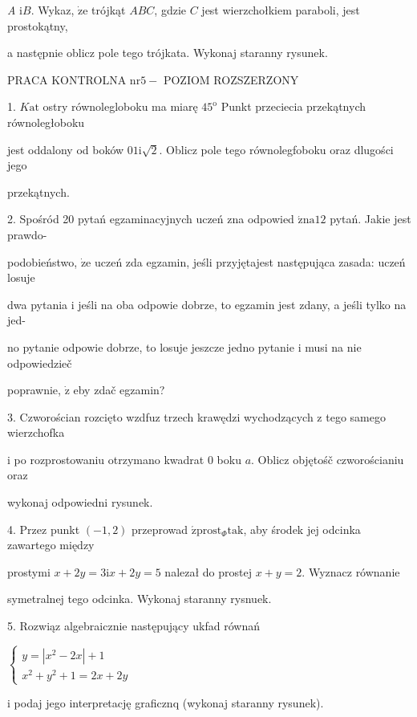 \documentclass[a4paper,12pt]{article}
\begin{document}
{\it A} $\mathrm{i}B$. Wykaz, $\dot{\mathrm{z}}\mathrm{e}$ trójkąt $ABC$, gdzie $C$ jest wierzchołkiem paraboli, jest prostokątny,

a następnie oblicz pole tego trójkata. Wykonaj staranny rysunek.




PRACA KONTROLNA $\mathrm{n}\mathrm{r} 5-$ POZIOM ROZSZERZONY

1. $K\mathrm{a}\mathrm{t}$ ostry równolegloboku ma miarę $45^{\mathrm{o}}$ Punkt przeciecia przekątnych równoległoboku

jest oddalony od boków $0 1\mathrm{i}\sqrt{2}$. Oblicz pole tego równolegfoboku oraz dlugości jego

przekątnych.

2. Spośród 20 pytań egzaminacyjnych uczeń zna odpowied $\acute{\mathrm{z}}\mathrm{n}\mathrm{a}12$ pytań. Jakie jest prawdo-

podobieństwo, $\dot{\mathrm{z}}\mathrm{e}$ uczeń zda egzamin, jeśli przyjętajest następująca zasada: uczeń losuje

dwa pytania $\mathrm{i}$ jeśli na oba odpowie dobrze, to egzamin jest zdany, a jeśli tylko na jed-

no pytanie odpowie dobrze, to losuje jeszcze jedno pytanie $\mathrm{i}$ musi na nie odpowiedzieč

poprawnie, $\dot{\mathrm{z}}$ eby zdač egzamin?

3. Czworościan rozcięto wzdfuz trzech krawędzi wychodzących $\mathrm{z}$ tego samego wierzchofka

$\mathrm{i}$ po rozprostowaniu otrzymano kwadrat $0$ boku $a$. Oblicz objętośč czworościaniu oraz

wykonaj odpowiedni rysunek.

4. Przez punkt $(-1,2)$ przeprowad $\acute{\mathrm{z}} \mathrm{p}\mathrm{r}\mathrm{o}\mathrm{s}\mathrm{t}_{\Phi}\mathrm{t}\mathrm{a}\mathrm{k}$, aby środek jej odcinka zawartego między

prostymi $x+2y = 3\mathrm{i}x+2y = 5$ nalezał do prostej $x+y = 2$. Wyznacz równanie

symetralnej tego odcinka. Wykonaj staranny rysnuek.

5. Rozwiąz algebraicznie następujący ukfad równań

$\left\{\begin{array}{l}
y=|x^{2}-2x|+1\\
x^{2}+y^{2}+1=2x+2y
\end{array}\right.$

$\mathrm{i}$ podaj jego interpretację graficznq (wykonaj staranny rysunek).
\end{document}

